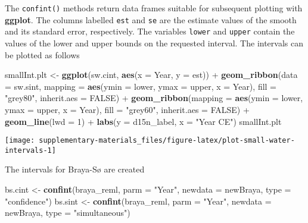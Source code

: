 \documentclass[12pt,]{article}
\newenvironment{Shaded}{\begin{snugshade}}{\end{snugshade}}
\newcommand{\KeywordTok}[1]{\textcolor[rgb]{0.13,0.29,0.53}{\textbf{{#1}}}}
\newcommand{\DataTypeTok}[1]{\textcolor[rgb]{0.13,0.29,0.53}{{#1}}}
\newcommand{\DecValTok}[1]{\textcolor[rgb]{0.00,0.00,0.81}{{#1}}}
\newcommand{\StringTok}[1]{\textcolor[rgb]{0.31,0.60,0.02}{{#1}}}
\newcommand{\OtherTok}[1]{\textcolor[rgb]{0.56,0.35,0.01}{{#1}}}
\newcommand{\NormalTok}[1]{{#1}}
\begin{document}
The \texttt{confint()} methods return data frames suitable for
subsequent plotting with \textbf{ggplot}. The columns labelled
\texttt{est} and \texttt{se} are the estimate values of the smooth and
its standard error, respectively. The variables \texttt{lower} and
\texttt{upper} contain the values of the lower and upper bounds on the
requested interval. The intervals can be plotted as follows

\begin{Shaded}
\begin{Highlighting}[]
\NormalTok{smallInt.plt <-}\StringTok{ }\KeywordTok{ggplot}\NormalTok{(sw.cint, }\KeywordTok{aes}\NormalTok{(}\DataTypeTok{x =} \NormalTok{Year, }\DataTypeTok{y =} \NormalTok{est)) +}
\StringTok{    }\KeywordTok{geom_ribbon}\NormalTok{(}\DataTypeTok{data =} \NormalTok{sw.sint,}
                \DataTypeTok{mapping =} \KeywordTok{aes}\NormalTok{(}\DataTypeTok{ymin =} \NormalTok{lower, }\DataTypeTok{ymax =} \NormalTok{upper, }\DataTypeTok{x =} \NormalTok{Year),}
                \DataTypeTok{fill =} \StringTok{"grey80"}\NormalTok{, }\DataTypeTok{inherit.aes =} \OtherTok{FALSE}\NormalTok{) +}
\StringTok{    }\KeywordTok{geom_ribbon}\NormalTok{(}\DataTypeTok{mapping =} \KeywordTok{aes}\NormalTok{(}\DataTypeTok{ymin =} \NormalTok{lower, }\DataTypeTok{ymax =} \NormalTok{upper, }\DataTypeTok{x =} \NormalTok{Year),}
                \DataTypeTok{fill =} \StringTok{"grey60"}\NormalTok{, }\DataTypeTok{inherit.aes =} \OtherTok{FALSE}\NormalTok{) +}
\StringTok{    }\KeywordTok{geom_line}\NormalTok{(}\DataTypeTok{lwd =} \DecValTok{1}\NormalTok{) +}
\StringTok{    }\KeywordTok{labs}\NormalTok{(}\DataTypeTok{y =} \NormalTok{d15n_label, }\DataTypeTok{x =} \StringTok{"Year CE"}\NormalTok{)}
\NormalTok{smallInt.plt}
\end{Highlighting}
\end{Shaded}

\begin{center}\texttt{[image: supplementary-materials\_files/figure-latex/plot-small-water-intervals-1]} \end{center}

The intervals for Braya-Sø are created

\begin{Shaded}
\begin{Highlighting}[]
\NormalTok{bs.cint <-}\StringTok{ }\KeywordTok{confint}\NormalTok{(braya_reml, }\DataTypeTok{parm =} \StringTok{"Year"}\NormalTok{, }\DataTypeTok{newdata =} \NormalTok{newBraya,}
                   \DataTypeTok{type =} \StringTok{"confidence"}\NormalTok{)}
\NormalTok{bs.sint <-}\StringTok{ }\KeywordTok{confint}\NormalTok{(braya_reml, }\DataTypeTok{parm =} \StringTok{"Year"}\NormalTok{, }\DataTypeTok{newdata =} \NormalTok{newBraya,}
                   \DataTypeTok{type =} \StringTok{"simultaneous"}\NormalTok{)}
\end{Highlighting}
\end{Shaded}
\end{document}
